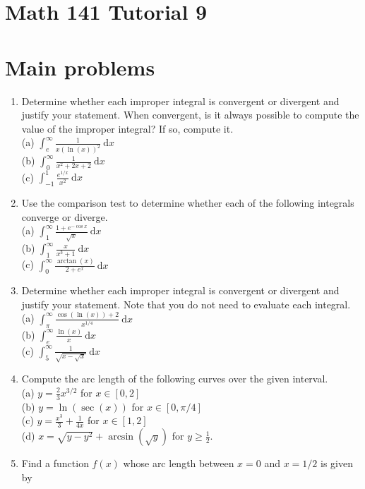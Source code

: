 \documentclass[10pt]{article}
\begin{document}
\section*{Math 141 Tutorial 9}
\section*{Main problems}
\begin{enumerate}
  \item Determine whether each improper integral is convergent or divergent and justify your statement. When convergent, is it always possible to compute the value of the improper integral? If so, compute it.\\
(a) $\int_{e}^{\infty} \frac{1}{x(\ln (x))^{2}} \mathrm{~d} x$\\
(b) $\int_{0}^{\infty} \frac{1}{x^{2}+2 x+2} \mathrm{~d} x$\\
(c) $\int_{-1}^{1} \frac{e^{1 / x}}{x^{2}} \mathrm{~d} x$
  \item Use the comparison test to determine whether each of the following integrals converge or diverge.\\
(a) $\int_{1}^{\infty} \frac{1+e^{-\cos x}}{\sqrt{x}} \mathrm{~d} x$\\
(b) $\int_{1}^{\infty} \frac{x}{x^{3}+1} \mathrm{~d} x$\\
(c) $\int_{0}^{\infty} \frac{\arctan (x)}{2+e^{x}} \mathrm{~d} x$
  \item Determine whether each improper integral is convergent or divergent and justify your statement. Note that you do not need to evaluate each integral.\\
(a) $\int_{\pi}^{\infty} \frac{\cos (\ln (x))+2}{x^{1 / 4}} \mathrm{~d} x$\\
(b) $\int_{e}^{\infty} \frac{\ln (x)}{x} \mathrm{~d} x$\\
(c) $\int_{5}^{\infty} \frac{1}{\sqrt{x-\sqrt{x}}} \mathrm{~d} x$
  \item Compute the arc length of the following curves over the given interval.\\
(a) $y=\frac{2}{3} x^{3 / 2}$ for $x \in[0,2]$\\
(b) $y=\ln (\sec (x))$ for $x \in[0, \pi / 4]$\\
(c) $y=\frac{x^{3}}{3}+\frac{1}{4 x}$ for $x \in[1,2]$\\
(d) $x=\sqrt{y-y^{2}}+\arcsin (\sqrt{y})$ for $y \geq \frac{1}{2}$.
  \item Find a function $f(x)$ whose arc length between $x=0$ and $x=1 / 2$ is given by
\end{enumerate}
\end{document}
